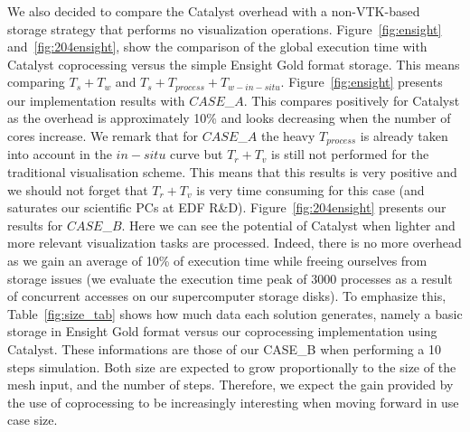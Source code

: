 We also decided to compare the Catalyst overhead with a non-VTK-based 
storage strategy that performs no visualization operations. Figure~\ref{fig:ensight} and~\ref{fig:204ensight}, 
show the comparison of the global execution time with Catalyst coprocessing
versus the simple Ensight Gold format storage. This means comparing $T_s + T_w$ 
and $T_s + T_{process} + T_{w-in-situ}$. Figure~\ref{fig:ensight} presents
our implementation results with $CASE$\_$A$. This compares positively for Catalyst as the overhead
is approximately 10\% and looks decreasing when the number of cores increase. We
remark that for $CASE$\_$A$ the heavy $T_{process}$ is already taken into
account in the $in-situ$ curve but $T_r + T_v$ is still not performed for the
traditional visualisation scheme. This means that this results is very positive
and we should not forget that $T_r + T_v$ is very time consuming for this case
(and saturates our scientific PCs at EDF R\&D). Figure~\ref{fig:204ensight}
presents our results for $CASE$\_$B$. Here we can see the potential of Catalyst
when 
lighter and more relevant visualization tasks are processed. Indeed, there is no more 
overhead as we gain an average of 10\% of execution time while freeing
ourselves from storage issues (we evaluate the execution time peak of
3000 processes as a result of concurrent accesses on our 
supercomputer storage disks). To emphasize this, Table~\ref{fig:size_tab} shows how much data each
solution generates, namely a basic storage in Ensight Gold format versus our
coprocessing implementation using Catalyst. These informations are those of our
CASE\_B when performing a 10 steps simulation. Both size are
expected to grow proportionally to the size of the mesh input, and the number of
steps. Therefore, we expect the gain provided by the use of coprocessing 
to be increasingly interesting when moving forward in use case size.

